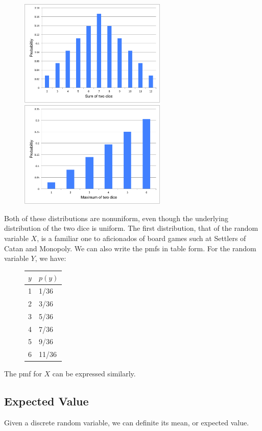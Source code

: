 \documentclass[notes.tex]{subfiles}
\begin{document}
\begin{example}
\begin{figure}[H]
\centering
\includegraphics[width=7cm]{sumoftwodice.pdf}
\includegraphics[width=7cm]{maxoftwodice.pdf}
\end{figure}
Both of these distributions are nonuniform, even though the underlying distribution of the two dice is uniform. The first distribution, that of the random variable $X$, is a familiar one to aficionados of board games such at Settlers of Catan and Monopoly. We can also write the pmfs in table form. For the random variable $Y$, we have:
\begin{figure}[H]
\centering
\begin{tabular}{l@{\hskip 2cm}l}
\toprule
$y$ & $p(y)$\\
\midrule
1 & 1/36\\
2 & 3/36\\
3 & 5/36\\
4 & 7/36\\
5 & 9/36\\
6 & 11/36\\
\bottomrule
\end{tabular}
\end{figure}
The pmf for $X$ can be expressed similarly.
\end{example}

\subsection{Expected Value}
Given a discrete random variable, we can definite its mean, or expected value. 
\end{document}
